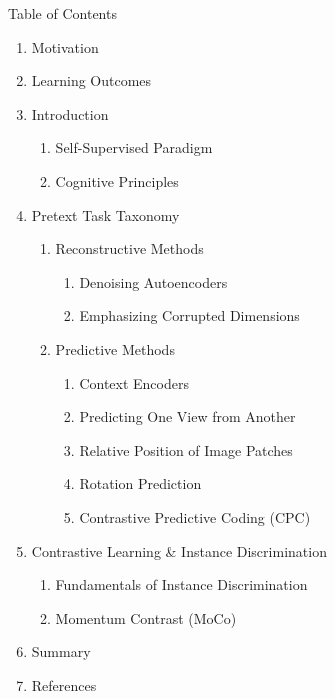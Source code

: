 \begin{frame}[allowframebreaks]{Table of Contents}
\begin{enumerate}
    \item Motivation
    \item Learning Outcomes
    \item Introduction
        \begin{enumerate}
            \item Self-Supervised Paradigm
            \item Cognitive Principles
        \end{enumerate}
    \item Pretext Task Taxonomy
        \begin{enumerate}
            \item Reconstructive Methods
                \begin{enumerate}
                    \item Denoising Autoencoders
                    \item Emphasizing Corrupted Dimensions
                \end{enumerate}
            \item Predictive Methods
                \begin{enumerate}
                    \item Context Encoders
                    \item Predicting One View from Another
                    \item Relative Position of Image Patches
                    \item Rotation Prediction
                    \item Contrastive Predictive Coding (CPC)
                \end{enumerate}
        \end{enumerate}
    \item Contrastive Learning \& Instance Discrimination
        \begin{enumerate}
            \item Fundamentals of Instance Discrimination
            \item Momentum Contrast (MoCo)
        \end{enumerate}
    \item Summary
    \item References
\end{enumerate}
\end{frame}
